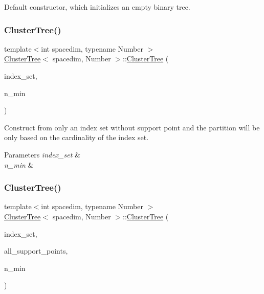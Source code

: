 Default constructor, which initializes an empty binary tree. \mbox{\label{classClusterTree_ae21fda96c7d405825a853f8759c0cc4c}} 
\subsubsection{\texorpdfstring{Cluster\+Tree()}{ClusterTree()}\hspace{0.1cm}{\footnotesize\ttfamily [2/5]}}
{\footnotesize\ttfamily template$<$int spacedim, typename Number $>$ \\
\hyperlink{classClusterTree}{Cluster\+Tree}$<$ spacedim, Number $>$\+::\hyperlink{classClusterTree}{Cluster\+Tree} (\begin{DoxyParamCaption}\item[{const std\+::vector$<$ types\+::global\+\_\+dof\+\_\+index $>$ \&}]{index\+\_\+set,  }\item[{const unsigned int}]{n\+\_\+min }\end{DoxyParamCaption})}

Construct from only an index set without support point and the partition will be only based on the cardinality of the index set. 
\begin{DoxyParams}{Parameters}
{\em index\+\_\+set} & \\
\hline
{\em n\+\_\+min} & \\
\hline
\end{DoxyParams}
\mbox{\label{classClusterTree_a587c465f14f7fa0e0e6a82aa8733452f}} 
\subsubsection{\texorpdfstring{Cluster\+Tree()}{ClusterTree()}\hspace{0.1cm}{\footnotesize\ttfamily [3/5]}}
{\footnotesize\ttfamily template$<$int spacedim, typename Number $>$ \\
\hyperlink{classClusterTree}{Cluster\+Tree}$<$ spacedim, Number $>$\+::\hyperlink{classClusterTree}{Cluster\+Tree} (\begin{DoxyParamCaption}\item[{const std\+::vector$<$ types\+::global\+\_\+dof\+\_\+index $>$ \&}]{index\+\_\+set,  }\item[{const std\+::vector$<$ Point$<$ spacedim $>$$>$ \&}]{all\+\_\+support\+\_\+points,  }\item[{const unsigned int}]{n\+\_\+min }\end{DoxyParamCaption})}

